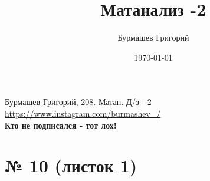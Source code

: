 \documentclass[a4paper,12pt]{article}
\author{Бурмашев Григорий}
\title{Матанализ  -2}
\date{\today}
\begin{document}
\begin{center}
Бурмашев Григорий, 208. Матан. Д/з - 2\\
\url{https://www.instagram.com/burmashev_/}  \\
\textbf{Кто не подписался - тот лох!} \\
\end{center}
\section*{№ 10 (листок 1)}
\end{document}

